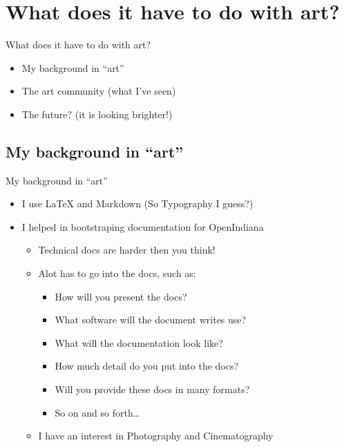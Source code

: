\documentclass[xcolor=svgnames,handout]{beamer}
\begin{document}
\section{What does it have to do with art?}

\begin{frame}{What does it have to do with art?}

	\begin{itemize}
		\item My background in ``art''
		\item The art community (what I've seen)
		\item The future? (it is looking brighter!)
	\end{itemize}

\end{frame}

\subsection{My background in ``art''}

\begin{frame}{My background in ``art''}
	\begin{itemize}
		\item I use \LaTeX{} and Markdown (So Typography I guess?)
		\item I helped in bootstraping documentation for OpenIndiana
			\begin{itemize}
				\item Technical docs are harder then you think!
				\item Alot has to go into the docs, such as:
					\begin{itemize}
						\item How will you present the docs?
						\item What software will the document writes use?
						\item What will the documentation look like?
						\item How much detail do you put into the docs?
						\item Will you provide these docs in many formats?
						\item So on and so forth\ldots
					\end{itemize}
				\item I have an interest in Photography and Cinematography
			\end{itemize}
	\end{itemize}
\end{frame}
\end{document}
